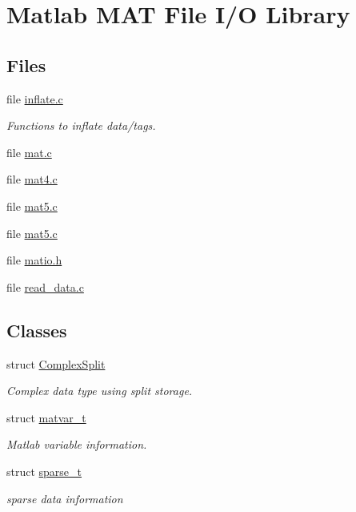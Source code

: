 \hypertarget{group__MAT}{\section{Matlab M\-A\-T File I/\-O Library}
\label{group__MAT}
}
\subsection*{Files}
\begin{DoxyCompactItemize}
\item 
file \hyperlink{inflate_8c}{inflate.\-c}
\begin{DoxyCompactList}\small\item\em Functions to inflate data/tags. \end{DoxyCompactList}\item 
file \hyperlink{mat_8c}{mat.\-c}
\item 
file \hyperlink{mat4_8c}{mat4.\-c}
\item 
file \hyperlink{mat5_8c}{mat5.\-c}
\item 
file \hyperlink{mat5_8c}{mat5.\-c}
\item 
file \hyperlink{matio_8h}{matio.\-h}
\item 
file \hyperlink{read__data_8c}{read\-\_\-data.\-c}
\end{DoxyCompactItemize}
\subsection*{Classes}
\begin{DoxyCompactItemize}
\item 
struct \hyperlink{structComplexSplit}{Complex\-Split}
\begin{DoxyCompactList}\small\item\em Complex data type using split storage. \end{DoxyCompactList}\item 
struct \hyperlink{structmatvar__t}{matvar\-\_\-t}
\begin{DoxyCompactList}\small\item\em Matlab variable information. \end{DoxyCompactList}\item 
struct \hyperlink{structsparse__t}{sparse\-\_\-t}
\begin{DoxyCompactList}\small\item\em sparse data information \end{DoxyCompactList}\end{DoxyCompactItemize}
